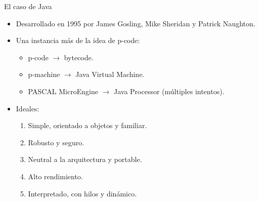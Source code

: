 \begin{frame}[t]{El caso de Java}
  \begin{itemize}
    \item Desarrollado en 1995 por James Gosling, Mike Sheridan y Patrick Naughton.
    \item Una instancia más de la idea de p-code:
      \begin{itemize}
        \item p-code $\rightarrow$ bytecode.
        \item p-machine $\rightarrow$ Java Virtual Machine.
        \item PASCAL MicroEngine $\rightarrow$ Java Processor (múltiples intentos).
      \end{itemize}
    \item \pause Ideales:
      \begin{enumerate}
        \item \pause Simple, orientado a objetos y familiar.
        \item \pause Robusto y seguro.
        \item \pause Neutral a la arquitectura y portable.
        \item \pause Alto rendimiento.
        \item \pause Interpretado, con hilos y dinámico.
      \end{enumerate}
  \end{itemize}
\end{frame}



